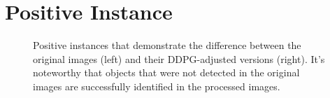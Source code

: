 \documentclass[PhD]{PHlab-thesis}
\begin{document}
\section{Positive Instance}
\begin{figure}[H]
    \centering  %
    \caption[Positive instances with DDPG adjustments]{Positive instances that demonstrate the difference between the original images (left) and their DDPG-adjusted versions (right). It's noteworthy that objects that were not detected in the original images are successfully identified in the processed images.}
    \label{Fig.main}
\end{figure}
\end{document}

